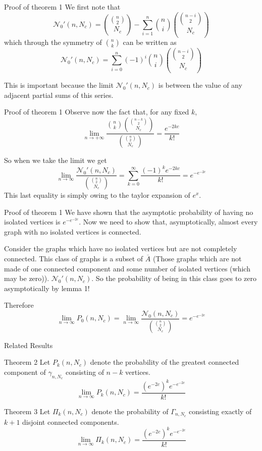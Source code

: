 \documentclass{beamer}
\begin{document}
\begin{frame}{Proof of theorem 1}
	We first note that
		$$\mathcal{N}_0'(n,N_c) = {{n\choose 2}\choose N_c}-\sum_{i=1}^n{n\choose i}{{n-i\choose 2}\choose N_c}$$
		which through the symmetry of ${n\choose k}$ can be written as 
		$$\mathcal{N}_0'(n,N_c) =\sum_{i=0}^n(-1)^i{n\choose i}{{n-i\choose 2}\choose N_c}$$

	This is important because the limit $\mathcal{N}_0'(n,N_c)$ is between the value of any adjacent partial sums of this series.
\end{frame}

\begin{frame}{Proof of theorem 1}
	Observe now the fact that, for any fixed $k$,
	$$\lim_{n\rightarrow +\infty}\frac{{n\choose k}{{n-k\choose2}\choose N_c}}{{{n\choose2}\choose N_c}}=\frac{e^{-2kc}}{k!}$$
	
	So when we take the limit we get
	$$\lim_{n\rightarrow \infty}\frac{\mathcal{N}_0'(n,N_c)}{{{n\choose 2}\choose N_c}}=\sum_{k=0}^\infty \frac{(-1)^ke^{-2kc}}{k!}=e^{-e^{-2c}}$$
	This last equality is simply owing to the taylor expansion of $e^x$. 
\end{frame}

\begin{frame}{Proof of theorem 1}
	We have shown that the asymptotic probability of having no isolated vertices is $e^{-e^{-2c}}$. Now we need to show that, asymptotically, almost every graph with no isolated vertices is connected.
	
	
 	Consider the graphs which have no isolated vertices but are not completely connected. This class of graphs is a subset of $\overline{A}$ (Those graphs which are not made of one connected component and some number of isolated vertices (which may be zero)). $\mathcal{N}_0'(n,N_c)$. So the probability of being in this class goes to zero asymptotically by lemma 1!
 	
 	Therefore $$\lim_{n\rightarrow \infty} P_0(n,N_c)=\lim_{n\rightarrow \infty}\frac{\mathcal{N}_0(n,N_c)}{{{n\choose 2}\choose N_c}}=e^{-e^{-2c}}$$ 
\end{frame}

\begin{frame}{Related Results}
\begin{block}{Theorem 2}
	Let $P_k(n,N_c)$ denote the probability of the greatest connected component of $\gamma_{n,N_c}$ consisting of $n-k$ vertices.
	$$\lim_{n\rightarrow \infty}P_k(n,N_c)=\frac{(e^{-2c})^ke^{-e^{-2c}}}{k!}$$
\end{block}

\begin{block}{Theorem 3}
	Let $\Pi_k(n,N_c)$ denote the probability of $\Gamma_{n,N_c}$ consisting exactly of $k+1$ disjoint connected components. 
	$$\lim_{n\rightarrow \infty}\Pi_k(n,N_c)=\frac{(e^{-2c})^ke^{-e^{-2c}}}{k!}$$
\end{block}
\end{frame}
\end{document}

